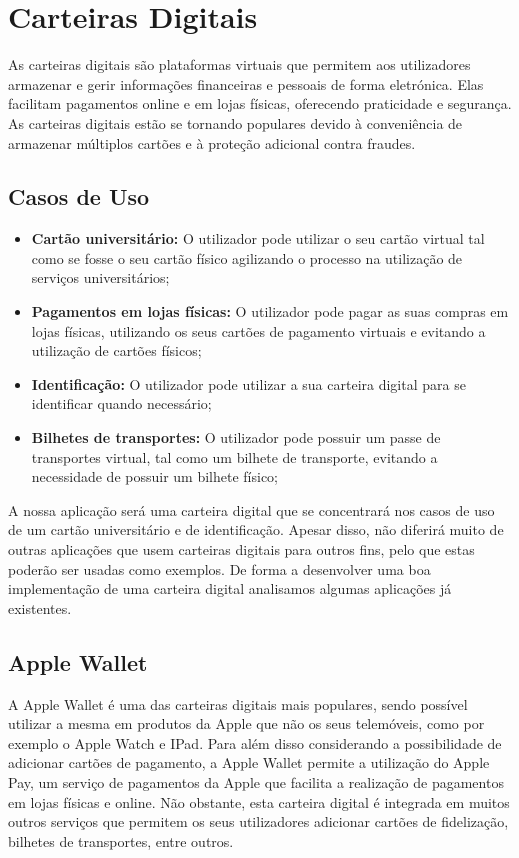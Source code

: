 \documentclass{article}
\begin{document}
\section{Carteiras Digitais}

As carteiras digitais são plataformas virtuais que permitem aos utilizadores armazenar e gerir informações financeiras e pessoais de forma eletrónica. Elas facilitam pagamentos online e em lojas físicas, oferecendo praticidade e segurança. As carteiras digitais estão se tornando populares devido à conveniência de armazenar múltiplos cartões e à proteção adicional contra fraudes.

\subsection{Casos de Uso}

\begin{itemize}
    \item \textbf{Cartão universitário:} O utilizador pode utilizar o seu cartão virtual tal como se fosse o seu cartão físico agilizando o processo na utilização de serviços universitários;
    \item \textbf{Pagamentos em lojas físicas:} O utilizador pode pagar as suas compras em lojas físicas, utilizando os seus cartões de pagamento virtuais e evitando a utilização de cartões físicos;
    \item \textbf{Identificação:} O utilizador pode utilizar a sua carteira digital para se identificar quando necessário;
    \item \textbf{Bilhetes de transportes:} O utilizador pode possuir um passe de transportes virtual, tal como um bilhete de transporte, evitando a necessidade de possuir um bilhete físico;
\end{itemize}


A nossa aplicação será uma carteira digital que se concentrará nos casos de uso de um cartão universitário e de identificação. Apesar disso, não diferirá muito de outras aplicações que usem carteiras digitais para outros fins, pelo que estas poderão ser usadas como exemplos. De forma a desenvolver uma boa implementação de uma carteira digital analisamos algumas aplicações já existentes.

\subsection{Apple Wallet}
A Apple Wallet é uma das carteiras digitais mais populares, sendo possível utilizar a mesma em produtos da Apple que não os seus telemóveis, como por exemplo o Apple Watch e IPad. Para além disso considerando a possibilidade de adicionar cartões de pagamento, a Apple Wallet permite a utilização do Apple Pay, um serviço de pagamentos da Apple que facilita a realização de pagamentos em lojas físicas e online. Não obstante, esta carteira digital é integrada em muitos outros serviços que permitem os seus utilizadores adicionar cartões de fidelização, bilhetes de transportes, entre outros.
\end{document}

